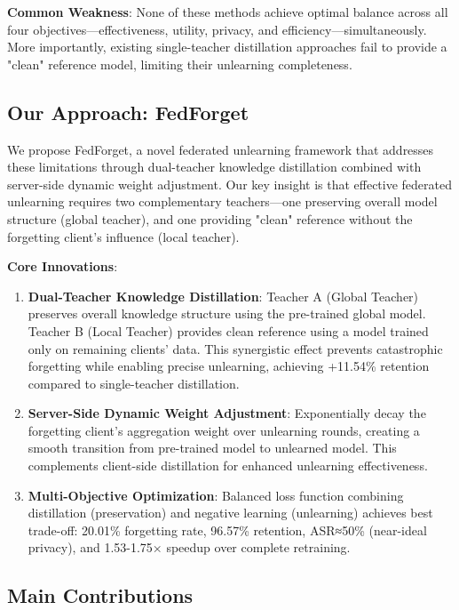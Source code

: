 \documentclass[10pt,twocolumn]{article}
\begin{document}
\textbf{Common Weakness}: None of these methods achieve optimal balance across all four objectives—effectiveness, utility, privacy, and efficiency—simultaneously. More importantly, existing single-teacher distillation approaches fail to provide a "clean" reference model, limiting their unlearning completeness.

\subsection{Our Approach: FedForget}

We propose FedForget, a novel federated unlearning framework that addresses these limitations through dual-teacher knowledge distillation combined with server-side dynamic weight adjustment. Our key insight is that effective federated unlearning requires two complementary teachers—one preserving overall model structure (global teacher), and one providing "clean" reference without the forgetting client's influence (local teacher).

\textbf{Core Innovations}:

\begin{enumerate}
\item \textbf{Dual-Teacher Knowledge Distillation}: Teacher A (Global Teacher) preserves overall knowledge structure using the pre-trained global model. Teacher B (Local Teacher) provides clean reference using a model trained only on remaining clients' data. This synergistic effect prevents catastrophic forgetting while enabling precise unlearning, achieving +11.54\% retention compared to single-teacher distillation.

\item \textbf{Server-Side Dynamic Weight Adjustment}: Exponentially decay the forgetting client's aggregation weight over unlearning rounds, creating a smooth transition from pre-trained model to unlearned model. This complements client-side distillation for enhanced unlearning effectiveness.

\item \textbf{Multi-Objective Optimization}: Balanced loss function combining distillation (preservation) and negative learning (unlearning) achieves best trade-off: 20.01\% forgetting rate, 96.57\% retention, ASR≈50\% (near-ideal privacy), and 1.53-1.75× speedup over complete retraining.
\end{enumerate}

\subsection{Main Contributions}
\end{document}
